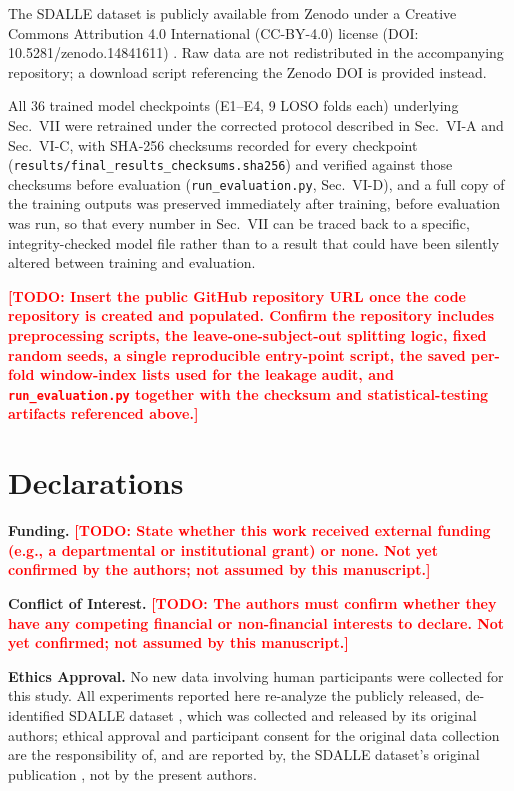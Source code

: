 \documentclass[conference]{IEEEtran}
\newcommand{\todo}[1]{\textcolor{red}{\textbf{[TODO: #1]}}}
\begin{document}
The SDALLE dataset is publicly available from Zenodo under a
Creative Commons Attribution 4.0 International (CC-BY-4.0) license
(DOI: 10.5281/zenodo.14841611) \cite{sdalle2025zenodo}. Raw data are
not redistributed in the accompanying repository; a download script
referencing the Zenodo DOI is provided instead.

All 36 trained model checkpoints (E1--E4, 9 LOSO folds each)
underlying Sec.~VII were retrained under the corrected protocol
described in Sec.~VI-A and Sec.~VI-C, with SHA-256 checksums recorded
for every checkpoint (\texttt{results/final\_results\_checksums.sha256})
and verified against those checksums before evaluation
(\texttt{run\_evaluation.py}, Sec.~VI-D), and a full copy of the
training outputs was preserved immediately after training, before
evaluation was run, so that every number in Sec.~VII can be traced
back to a specific, integrity-checked model file rather than to a
result that could have been silently altered between training and
evaluation.

\todo{Insert the public GitHub repository URL once the code
repository is created and populated. Confirm the repository includes
preprocessing scripts, the leave-one-subject-out splitting logic,
fixed random seeds, a single reproducible entry-point script, the
saved per-fold window-index lists used for the leakage audit, and
\texttt{run\_evaluation.py} together with the checksum and
statistical-testing artifacts referenced above.}

\section*{Declarations}
\label{sec:declarations}

\textbf{Funding.} \todo{State whether this work received external
funding (e.g., a departmental or institutional grant) or none. Not
yet confirmed by the authors; not assumed by this manuscript.}

\textbf{Conflict of Interest.} \todo{The authors must confirm
whether they have any competing financial or non-financial interests
to declare. Not yet confirmed; not assumed by this manuscript.}

\textbf{Ethics Approval.} No new data involving human participants
were collected for this study. All experiments reported here
re-analyze the publicly released, de-identified SDALLE dataset
\cite{sdalle2025zenodo, el-khoreby2025sdalle}, which was collected and
released by its original authors; ethical approval and participant
consent for the original data collection are the responsibility of,
and are reported by, the SDALLE dataset's original publication
\cite{el-khoreby2025sdalle}, not by the present authors.
\end{document}
